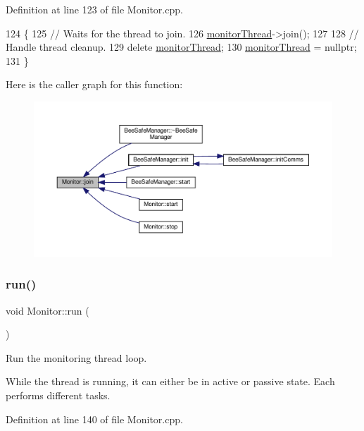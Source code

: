 Definition at line 123 of file Monitor.\+cpp.


\begin{DoxyCode}
124 \{
125     \textcolor{comment}{// Waits for the thread to join.}
126     \hyperlink{class_monitor_a1e6bfb7c47a223d8bdc537e2cff07822}{monitorThread}->join();
127 
128     \textcolor{comment}{// Handle thread cleanup.}
129     \textcolor{keyword}{delete} \hyperlink{class_monitor_a1e6bfb7c47a223d8bdc537e2cff07822}{monitorThread};
130     \hyperlink{class_monitor_a1e6bfb7c47a223d8bdc537e2cff07822}{monitorThread} = \textcolor{keyword}{nullptr};
131 \}
\end{DoxyCode}
Here is the caller graph for this function\+:
\nopagebreak
\begin{figure}[H]
\begin{center}
\leavevmode
\includegraphics[width=350pt]{d9/df7/class_monitor_a2d2e309666c98333a317c9786f94f6ad_icgraph}
\end{center}
\end{figure}
\mbox{\label{class_monitor_a81666ecd4a8db05fd3090f7e47eca6ed}} 
\subsubsection{\texorpdfstring{run()}{run()}}
{\footnotesize\ttfamily void Monitor\+::run (\begin{DoxyParamCaption}{ }\end{DoxyParamCaption})\hspace{0.3cm}{\ttfamily [private]}}

Run the monitoring thread loop.

While the thread is running, it can either be in active or passive state. Each performs different tasks. 

Definition at line 140 of file Monitor.\+cpp.


